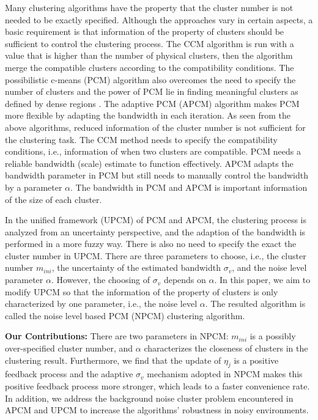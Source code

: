 \documentclass[journal]{IEEEtran}
\theoremstyle{definition}
\begin{document}
Many clustering algorithms have the property that the cluster number is not needed to be exactly specified.
Although the approaches vary in certain aspects, a basic requirement is that information of the property of clusters should be sufficient to control the clustering process.
The CCM algorithm \cite{krishnapuram_fitting_1992} is run with a value that is higher than the number of physical clusters, then the algorithm merge the compatible clusters according to the compatibility conditions. The possibilistic c-means (PCM) \cite{krishnapuram_possibilistic_1993} algorithm also overcomes the need to specify the number of clusters and the power of PCM lie in finding meaningful clusters as defined by dense regions \cite{krishnapuram_possibilistic_1996}. The adaptive PCM (APCM) \cite{xenaki_novel_2016} algorithm makes PCM more flexible by adapting the bandwidth in each iteration. As seen from the above algorithms, reduced information of the cluster number is not sufficient for the clustering task. The CCM method needs to specify the compatibility conditions, i.e., information of when two clusters are compatible. PCM needs a reliable bandwidth (scale) estimate to function effectively. APCM adapts the bandwidth parameter in PCM but still needs to manually control the bandwidth by a parameter $\alpha$. The bandwidth in PCM and APCM is important information of the size of each cluster.

In the unified framework (UPCM) \cite{hou_pcm_2016} of PCM and APCM, the clustering process is analyzed from an uncertainty perspective, and the adaption of the bandwidth is performed in a more fuzzy way. There is also no need to specify the exact the cluster number in UPCM. There are three parameters to choose, i.e., the cluster number $m_{ini}$, the uncertainty of the estimated bandwidth $\sigma_v$, and the noise level parameter $\alpha$. However, the choosing of $\sigma_v$ depends on $\alpha$. In this paper, we aim to modify UPCM so that the information of the property of clusters is only characterized by one parameter, i.e., the noise level $\alpha$. 
The resulted algorithm is called the noise level based PCM (NPCM) clustering algorithm.

\textbf{Our Contributions:}
There are two parameters in NPCM: $m_{ini}$ is a possibly over-specified cluster number, and $\alpha$ characterizes the closeness of clusters in the clustering result.
Furthermore, we find that the update of $\eta_j$ is a positive feedback process and the adaptive $\sigma_v$ mechanism adopted in NPCM makes this positive feedback process more stronger, which leads to a faster convenience rate.
In addition, we address the background noise cluster problem encountered in APCM and UPCM to increase the algorithms' robustness in noisy environments.
\end{document}
